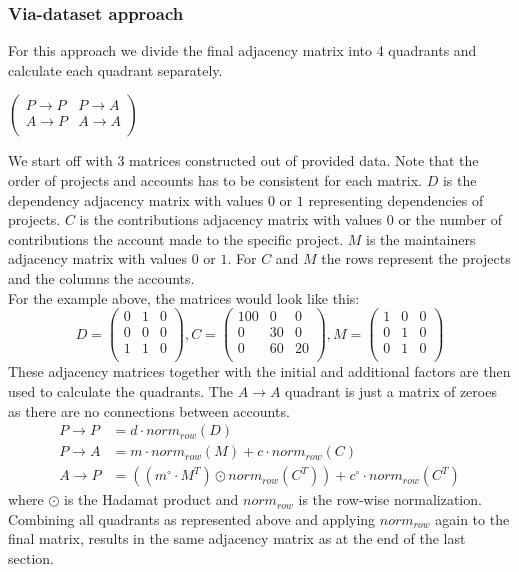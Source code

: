 \documentclass{article}
\begin{document}
\subsubsection{Via-dataset approach}
For this approach we divide the final adjacency matrix into 4 quadrants and
calculate each quadrant separately.
\begin{center}
  \begin{math}
    \left(
    \begin{array}{ c|c }
      P\rightarrow P & P\rightarrow A \\
      \hline
      A\rightarrow P & A\rightarrow A \\
    \end{array}
    \right)
  \end{math}
\end{center}
We start off with 3 matrices constructed out of provided data. Note that the
order of projects and accounts has to be consistent for each matrix. $D$ is the
dependency adjacency matrix with values $0$ or $1$ representing dependencies of
projects. $C$ is the contributions adjacency matrix with values $0$ or the number
of contributions the account made to the specific project. $M$ is the maintainers
adjacency matrix with values $0$ or $1$. For $C$ and $M$ the rows represent the
projects and the columns the accounts.\\
For the example above, the matrices would look like this:
\begin{displaymath}
  D =
  \begin{pmatrix}
    0 & 1 & 0 \\
    0 & 0 & 0 \\
    1 & 1 & 0 \\
  \end{pmatrix}
  , C =
  \begin{pmatrix}
    100 & 0 & 0 \\
    0 & 30 & 0 \\
    0 & 60 & 20 \\
  \end{pmatrix}
  , M =
  \begin{pmatrix}
    1 & 0 & 0 \\
    0 & 1 & 0 \\
    0 & 1 & 0 \\
  \end{pmatrix}
\end{displaymath}
These adjacency matrices together with the initial and additional factors are
then used to calculate the quadrants. The $A\rightarrow A$ quadrant is just a
matrix of zeroes as there are no connections between accounts.
\begin{align*}
  P\rightarrow P &= d \cdot norm_{row}(D) \\
  P\rightarrow A &= m \cdot norm_{row}(M) + c\cdot norm_{row}(C) \\
  A\rightarrow P &= ((m^{\circ}\cdot M^T) \odot norm_{row}(C^T)) + c^{\circ}\cdot norm_{row}(C^T)
\end{align*}
where $\odot$ is the Hadamat product and $norm_{row}$ is the row-wise
normalization.\\
Combining all quadrants as represented above and applying $norm_{row}$ again to
the final matrix, results in the same adjacency matrix as at the end of the last
section.
\end{document}
